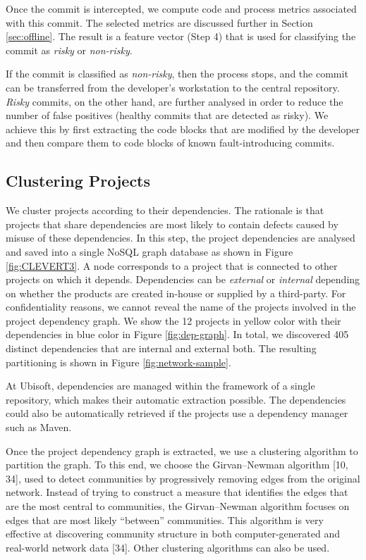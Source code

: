 \documentclass[sigconf]{acmart}
\begin{document}
Once the commit is intercepted, we compute code and process metrics
associated with this commit. The selected metrics are discussed further
in Section \ref{sec:offline}. The result is a feature vector (Step 4)
that is used for classifying the commit as \emph{risky} or
\emph{non-risky}.

If the commit is classified as \emph{non-risky}, then the process stops,
and the commit can be transferred from the developer's workstation to
the central repository. \emph{Risky} commits, on the other hand, are
further analysed in order to reduce the number of false positives
(healthy commits that are detected as risky). We achieve this by first
extracting the code blocks that are modified by the developer and then
compare them to code blocks of known fault-introducing commits.

\subsection{Clustering Projects}\label{sec:clustering}

We cluster projects according to their dependencies. The rationale is
that projects that share dependencies are most likely to contain defects
caused by misuse of these dependencies. In this step, the project
dependencies are analysed and saved into a single NoSQL graph database
as shown in Figure \ref{fig:CLEVERT3}. A node corresponds to a project
that is connected to other projects on which it depends. Dependencies
can be \emph{external} or \emph{internal} depending on whether the
products are created in-house or supplied by a third-party. For
confidentiality reasons, we cannot reveal the name of the projects
involved in the project dependency graph. We show the 12 projects in
yellow color with their dependencies in blue color in Figure
\ref{fig:dep-graph}. In total, we discovered 405 distinct dependencies
that are internal and external both. The resulting partitioning is shown
in Figure \ref{fig:network-sample}.



At Ubisoft, dependencies are managed within the framework of a single
repository, which makes their automatic extraction possible. The
dependencies could also be automatically retrieved if the projects use a
dependency manager such as Maven.



Once the project dependency graph is extracted, we use a clustering
algorithm to partition the graph. To this end, we choose the
Girvan--Newman algorithm [10, 34], used to detect communities by
progressively removing edges from the original network. Instead of
trying to construct a measure that identifies the edges that are the
most central to communities, the Girvan--Newman algorithm focuses on
edges that are most likely ``between'' communities. This algorithm is
very effective at discovering community structure in both
computer-generated and real-world network data [34]. Other
clustering algorithms can also be used.
\end{document}
